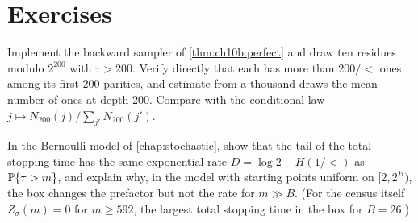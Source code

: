 \section*{Exercises}

\begin{exercise}
Implement the backward sampler of \cref{thm:ch10b:perfect} and draw ten
residues modulo $2^{200}$ with $\tau>200$. Verify directly that each has more
than $200/\lt$ ones among its first $200$ parities, and estimate from a
thousand draws the mean number of ones at depth $200$. Compare with the
conditional law $j\mapsto N_{200}(j)/\sum_{j'}N_{200}(j')$.
\end{exercise}

\begin{exercise}
In the Bernoulli model of \cref{chap:stochastic}, show that the tail of the total stopping time has the same
exponential rate $D=\log2-H(1/\lt)$ as $\mathbb{P}\{\tau>m\}$, and explain why, in the model with starting points uniform on $[2,2^B)$, the box changes the prefactor but not the rate for $m\gg B$. (For the census itself $Z_\sigma(m)=0$ for $m\ge592$, the largest total stopping time in the box for $B=26$.)
\end{exercise}

